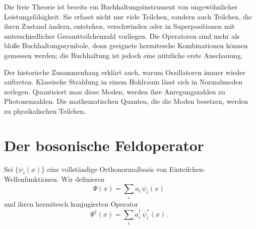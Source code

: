 Die freie Theorie ist bereits ein Buchhaltungsinstrument von ungewöhnlicher Leistungsfähigkeit. Sie erfasst nicht nur viele Teilchen, sondern auch Teilchen, die ihren Zustand ändern, entstehen, verschwinden oder in Superpositionen mit unterschiedlicher Gesamtteilchenzahl vorliegen. Die Operatoren sind mehr als bloße Buchhaltungssymbole, denn geeignete hermitesche Kombinationen können gemessen werden; die Buchhaltung ist jedoch eine nützliche erste Anschauung.

\begin{classroomqa}
\end{classroomqa}

Der historische Zusammenhang erklärt auch, warum Oszillatoren immer wieder auftreten. Klassische Strahlung in einem Hohlraum lässt sich in Normalmoden zerlegen. Quantisiert man diese Moden, werden ihre Anregungszahlen zu Photonenzahlen. Die mathematischen Quanten, die die Moden besetzen, werden zu physikalischen Teilchen.

\section{Der bosonische Feldoperator}

Sei \(\{\psi_i(x)\}\) eine vollständige Orthonormalbasis von Einteilchen-Wellenfunktionen. Wir definieren
\begin{equation}
\boxed{\Psi(x)=\sum_i a_i\,\psi_i(x)}
\label{eq:l06-field-annihilation}
\end{equation}
und ihren hermitesch konjugierten Operator
\begin{equation}
\boxed{\Psi^\dagger(x)=\sum_i a_i^\dagger\,\psi_i^*(x)}.
\label{eq:l06-field-creation}
\end{equation}

